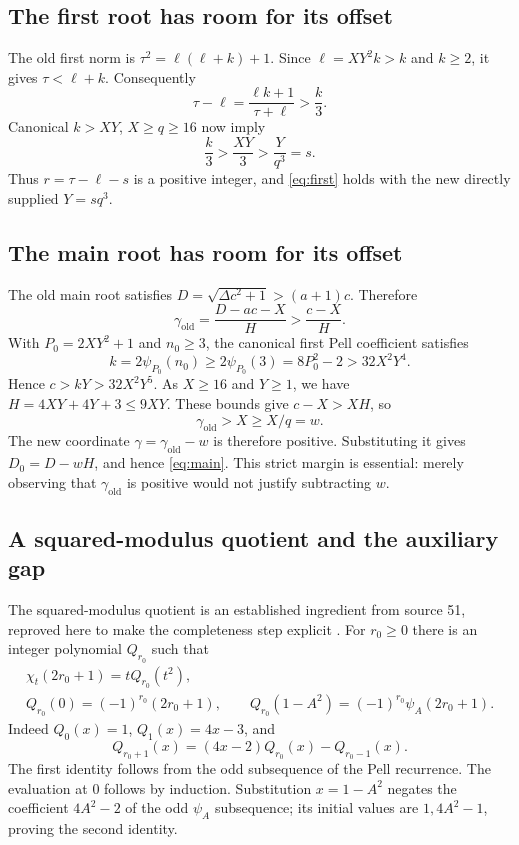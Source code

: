 \documentclass[11pt,a4paper]{article}
\theoremstyle{remark}
\newcommand{\ord}{\mathrm{old}}
\begin{document}
\subsection{The first root has room for its offset}

The old first norm is $\tau^2=\ell(\ell+k)+1$. Since
$\ell=XY^2k>k$ and $k\ge2$, it gives $\tau<\ell+k$. Consequently
\begin{equation}
 \tau-\ell=\frac{\ell k+1}{\tau+\ell}>\frac{k}{3}.
 \label{eq:firstgap}
\end{equation}
Canonical $k>XY$, $X\ge q\ge16$ now imply
\[
 \frac{k}{3}>\frac{XY}{3}>\frac{Y}{q^3}=s.
\]
Thus $r=\tau-\ell-s$ is a positive integer, and \eqref{eq:first} holds
with the new directly supplied $Y=sq^3$.

\subsection{The main root has room for its offset}

The old main root satisfies $D=\sqrt{\Delta c^2+1}>(a+1)c$.
Therefore
\begin{equation}
 \gamma_{\ord}=\frac{D-ac-X}{H}>\frac{c-X}{H}.
 \label{eq:gammabound}
\end{equation}
With $P_0=2XY^2+1$ and $n_0\ge3$, the canonical first Pell coefficient
satisfies
\[
 k=2\psi_{P_0}(n_0)\ge2\psi_{P_0}(3)=8P_0^2-2>32X^2Y^4.
\]
Hence $c>kY>32X^2Y^5$. As $X\ge16$ and $Y\ge1$, we have
$H=4XY+4Y+3\le9XY$. These bounds give $c-X>XH$, so
\[
 \gamma_{\ord}>X\ge X/q=w.
\]
The new coordinate $\gamma=\gamma_{\ord}-w$ is therefore positive.
Substituting it gives $D_0=D-wH$, and hence \eqref{eq:main}.
This strict margin is essential: merely observing that $\gamma_{\ord}$
is positive would not justify subtracting $w$.

\subsection{A squared-modulus quotient and the auxiliary gap}

The squared-modulus quotient is an established ingredient from source 51,
reproved here to make the completeness step explicit \cite{source51}.
For $r_0\ge0$ there is an integer polynomial $Q_{r_0}$ such that
\begin{gather}
 \chi_t(2r_0+1)=tQ_{r_0}(t^2),\label{eq:oddpoly}\\
 Q_{r_0}(0)=(-1)^{r_0}(2r_0+1),\qquad
 Q_{r_0}(1-A^2)=(-1)^{r_0}\psi_A(2r_0+1).
 \label{eq:oddcongruence}
\end{gather}
Indeed $Q_0(x)=1$, $Q_1(x)=4x-3$, and
\[
 Q_{r_0+1}(x)=(4x-2)Q_{r_0}(x)-Q_{r_0-1}(x).
\]
The first identity follows from the odd subsequence of the Pell recurrence.
The evaluation at $0$ follows by induction. Substitution $x=1-A^2$
negates the coefficient $4A^2-2$ of the odd $\psi_A$ subsequence; its
initial values are $1,4A^2-1$, proving the second identity.
\end{document}
